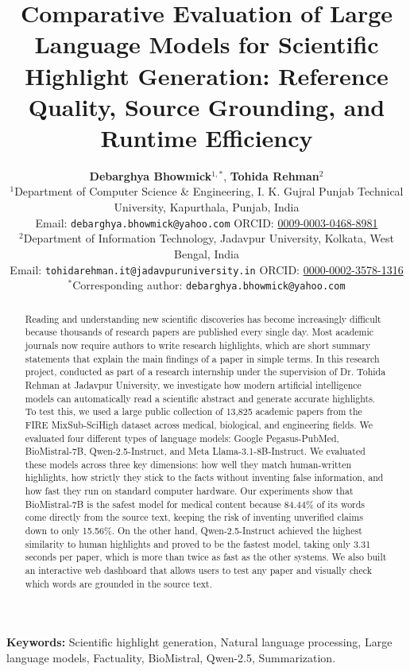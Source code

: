 \documentclass[11pt,a4paper]{article}
\title{\Large\textbf{Comparative Evaluation of Large Language Models for Scientific Highlight Generation: Reference Quality, Source Grounding, and Runtime Efficiency}}
\author{%
  \textbf{Debarghya Bhowmick}$^{1,*}$, \textbf{Tohida Rehman}$^{2}$\\[0.8em]
  \small $^{1}$Department of Computer Science \& Engineering, I. K. Gujral Punjab Technical University, Kapurthala, Punjab, India\\
  \small Email: \texttt{debarghya.bhowmick@yahoo.com} \quad ORCID: \href{https://orcid.org/0009-0003-0468-8981}{0009-0003-0468-8981}\\[0.4em]
  \small $^{2}$Department of Information Technology, Jadavpur University, Kolkata, West Bengal, India\\
  \small Email: \texttt{tohidarehman.it@jadavpuruniversity.in} \quad ORCID: \href{https://orcid.org/0000-0002-3578-1316}{0000-0002-3578-1316}\\[0.6em]
  \small $^{*}$Corresponding author: \texttt{debarghya.bhowmick@yahoo.com}
}
\date{}
\begin{document}
\maketitle

\begin{abstract}
Reading and understanding new scientific discoveries has become increasingly difficult because thousands of research papers are published every single day. Most academic journals now require authors to write research highlights, which are short summary statements that explain the main findings of a paper in simple terms. In this research project, conducted as part of a research internship under the supervision of Dr. Tohida Rehman at Jadavpur University, we investigate how modern artificial intelligence models can automatically read a scientific abstract and generate accurate highlights. To test this, we used a large public collection of 13,825 academic papers from the FIRE MixSub-SciHigh dataset across medical, biological, and engineering fields. We evaluated four different types of language models: Google Pegasus-PubMed, BioMistral-7B, Qwen-2.5-Instruct, and Meta Llama-3.1-8B-Instruct. We evaluated these models across three key dimensions: how well they match human-written highlights, how strictly they stick to the facts without inventing false information, and how fast they run on standard computer hardware. Our experiments show that BioMistral-7B is the safest model for medical content because 84.44\% of its words come directly from the source text, keeping the risk of inventing unverified claims down to only 15.56\%. On the other hand, Qwen-2.5-Instruct achieved the highest similarity to human highlights and proved to be the fastest model, taking only 3.31 seconds per paper, which is more than twice as fast as the other systems. We also built an interactive web dashboard that allows users to test any paper and visually check which words are grounded in the source text.
\end{abstract}

\vspace{0.5em}
\noindent\textbf{Keywords:} Scientific highlight generation, Natural language processing, Large language models, Factuality, BioMistral, Qwen-2.5, Summarization.

\vspace{1em}

\end{document}

